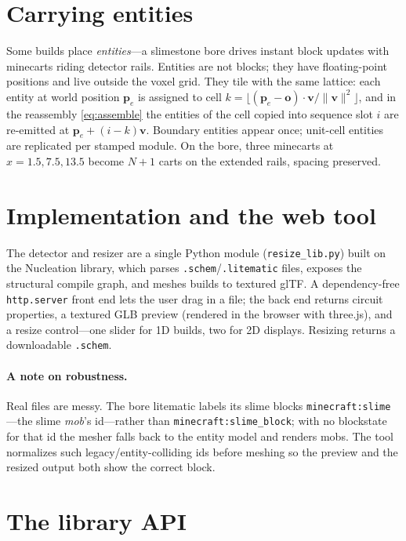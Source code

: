 \documentclass[11pt]{article}
\newcommand{\vv}{\mathbf{v}}
\newcommand{\pp}{\mathbf{p}}
\newcommand{\oo}{\mathbf{o}}
\begin{document}
\section{Carrying entities}\label{sec:entities}

Some builds place \emph{entities}---a slimestone bore drives instant block
updates with minecarts riding detector rails. Entities are not blocks; they have
floating-point positions and live outside the voxel grid. They tile with the same
lattice: each entity at world position $\pp_e$ is assigned to cell
$k=\lfloor(\pp_e-\oo)\cdot\vv/\lVert\vv\rVert^2\rfloor$, and in the reassembly
\eqref{eq:assemble} the entities of the cell copied into sequence slot $i$ are
re-emitted at $\pp_e + (i-k)\vv$. Boundary entities appear once; unit-cell
entities are replicated per stamped module. On the bore, three minecarts at
$x=1.5,7.5,13.5$ become $N{+}1$ carts on the extended rails, spacing preserved.

\section{Implementation and the web tool}

The detector and resizer are a single Python module (\texttt{resize\_lib.py})
built on the Nucleation library, which parses \texttt{.schem}/\texttt{.litematic}
files, exposes the structural compile graph, and meshes builds to textured glTF.
A dependency-free \texttt{http.server} front end lets the user drag in a file;
the back end returns circuit properties, a textured GLB preview (rendered in the
browser with three.js), and a resize control---one slider for 1D builds, two for
2D displays. Resizing returns a downloadable \texttt{.schem}.

\paragraph{A note on robustness.} Real files are messy. The bore litematic labels
its slime blocks \texttt{minecraft:slime}---the slime \emph{mob}'s id---rather
than \texttt{minecraft:slime\_block}; with no blockstate for that id the mesher
falls back to the entity model and renders mobs. The tool normalizes such
legacy/entity-colliding ids before meshing so the preview and the resized output
both show the correct block.

\section{The library API}\label{sec:api}
\end{document}
